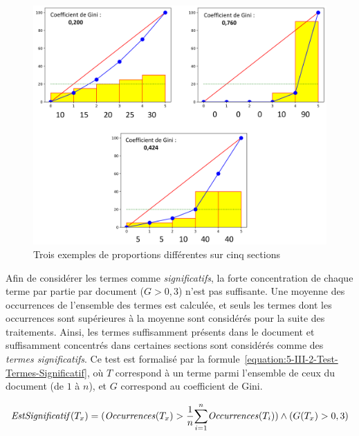 \begin{figure}[ht]
\centering
\centerline{  %
\includegraphics[scale=0.6]{5-Conclusion/images/3-analyse-temporelle/exemple_courbes_lorenz.png}
}
\caption{Trois exemples de proportions différentes sur cinq sections}
\label{figure:5-III-2-ExempleCourbeLorenz3Proportions}
\end{figure}


Afin de considérer les termes comme \textit{significatifs}, la forte concentration de chaque terme par partie par document ($ G > 0,3 $) n'est pas suffisante.
Une moyenne des occurrences de l'ensemble des termes est calculée, et seuls les termes dont les occurrences sont supérieures à la moyenne sont considérés pour la suite des traitements.
Ainsi, les termes suffisamment présents dans le document et suffisamment concentrés dans certaines sections sont considérés comme des \textit{termes significatifs}.
Ce test est formalisé par la formule~\eqref{equation:5-III-2-Test-Termes-Significatif}, où $ T $ correspond à un terme parmi l'ensemble de ceux du document (de $ 1 $ à $ n $), et $ G $ correspond au coefficient de Gini.

\medskip

\begin{equation}
\text{\textit{EstSignificatif}}(T_{x}) = (\text{\textit{Occurrences}}(T_{x}) > \frac{1}{n} \overset{n}{\underset{i = 1}{\sum}} {\text{\textit{Occurrences}}(T_{i})})    \wedge     (G(T_{x}) > 0,3)
\label{equation:5-III-2-Test-Termes-Significatif}
\end{equation}

